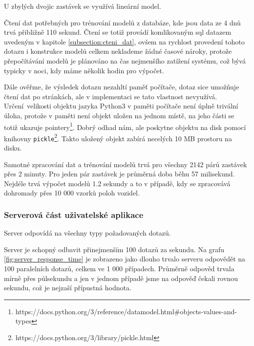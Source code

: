 \bigbreak

U zbylých dvojic zastávek se využívá lineární model.

\bigbreak

Čtení dat potřebných pro trénování modelů z databáze, kde jsou data ze 4 dnů trvá přibližně 110 sekund. Čtení se totiž provádí komlikovaným \gls{sql} datazem uvedeným v kapitole \ref{subsection:cteni_dat}, ovšem na rychlost provedení tohoto dotazu i konstrukce modelů celkem neklademe žádné časové nároky, protože přepočítávání modelů je plánováno na čas nejmenšího zatížení systému, což bývá typicky v noci, kdy máme několik hodin pro výpočet.

\bigbreak

Dále ověřme, že výsledek dotazu nezahltí paměť počítače, dotaz sice umožňuje čtení dat po stránkách, ale v implementaci se tato vlastnost nevyužívá. Určení velikosti objektu jazyka Python3 v paměti počítače není úplně trivální úloha, protože v paměti není objekt uložen na jednom místě, na jeho části se totiž ukazuje pointery\footnote{https://docs.python.org/3/reference/datamodel.html\#objects-values-and-types}. Dobrý odhad nám, ale poskytne objektu na disk pomocí knihovny \verb-pickle-\footnote{https://docs.python.org/3/library/pickle.html}. Takto uložený objekt zabírá necelých 10 MB prostoru na disku.

\bigbreak

Samotné zpracování dat a trénování modelů trvá pro všechny 2142 párů zastávek přes 2 minuty. Pro jeden pár zastávek je průměrná doba běhu 57 milisekund. Nejdéle trvá výpočet modelů 1.2 sekundy a to v případě, kdy se zpracovává dohromady přes 10 000 vzorků poloh vozidel.

\subsubsection{Serverová část uživatelské aplikace}

Server odpovídá na všechny typy požadovaných dotazů.

\bigbreak

Server je schopný odbavit přinejmenším 100 dotazů za sekundu. Na grafu \ref{fig:server_response_time} je zobrazeno jako dlouho trvalo serveru odpovědět na 100 paralelních dotazů, celkem ve 1 000 případech. Průměrně odpověd trvala mírně přes půlsekundu a jen v jednom případě jsme na odpověď čekali rovnou sekundu, což je nejzaší přípustná hodnota.

